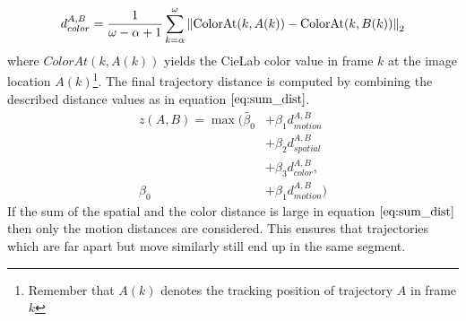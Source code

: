 \begin{equation}
	d_{color}^{A,B} = \frac{1}{\omega - \alpha + 1} \sum_{k=\alpha}^\omega \left\lVert\text{ColorAt}(k, A(k)) - \text{ColorAt}(k, B(k))\right\rVert_2
	\label{eq:color_dist}
\end{equation}
where $ColorAt(k, A(k))$ yields the CieLab color value in frame $k$ at the image location $A(k)$\footnote{Remember that $A(k)$ denotes the tracking position of trajectory $A$ in frame $k$}.
The final trajectory distance is computed by combining the described distance values as in equation $\ref{eq:sum_dist}$.
\begin{equation}
\begin{aligned}
z ( A, B ) = \max (\tilde{\beta_0} & + \beta_1 d_{motion}^{A,B} \\
& + \beta_2 d_{spatial}^{A,B} \\
& + \beta_3 d_{color}^{A,B},\\
\beta_0 & + \beta_1 d_{motion}^{A,B} )
\end{aligned}
\label{eq:sum_dist}
\end{equation}
If the sum of the spatial and the color distance is large in equation $\ref{eq:sum_dist}$ then only the motion distances are considered. This ensures that trajectories which are far apart but move similarly still end up in the same segment.

